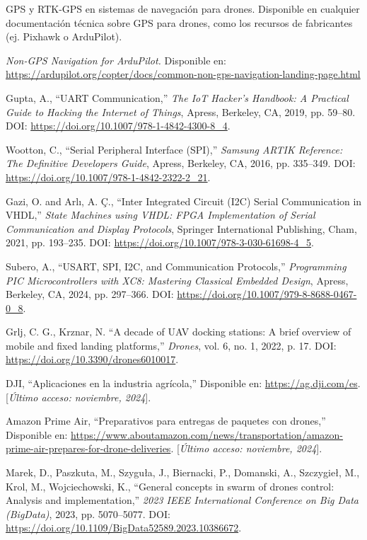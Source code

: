 \begin{thebibliography}{30}
        GPS y RTK-GPS en sistemas de navegación para drones. Disponible en cualquier documentación técnica sobre GPS para drones, como los recursos de fabricantes (ej. Pixhawk o ArduPilot).
    
        \textit{Non-GPS Navigation for ArduPilot.} Disponible en: \url{https://ardupilot.org/copter/docs/common-non-gps-navigation-landing-page.html}

    Gupta, A., ``UART Communication,'' \textit{The IoT Hacker's Handbook: A Practical Guide to Hacking the Internet of Things}, Apress, Berkeley, CA, 2019, pp. 59--80. DOI: \url{https://doi.org/10.1007/978-1-4842-4300-8_4}.

    Wootton, C., ``Serial Peripheral Interface (SPI),'' \textit{Samsung ARTIK Reference: The Definitive Developers Guide}, Apress, Berkeley, CA, 2016, pp. 335--349. DOI: \url{https://doi.org/10.1007/978-1-4842-2322-2_21}.

    Gazi, O. and Arlı, A. Ç., ``Inter Integrated Circuit (I2C) Serial Communication in VHDL,'' \textit{State Machines using VHDL: FPGA Implementation of Serial Communication and Display Protocols}, Springer International Publishing, Cham, 2021, pp. 193--235. DOI: \url{https://doi.org/10.1007/978-3-030-61698-4_5}.

    Subero, A., ``USART, SPI, I2C, and Communication Protocols,'' \textit{Programming PIC Microcontrollers with XC8: Mastering Classical Embedded Design}, Apress, Berkeley, CA, 2024, pp. 297--366. DOI: \url{https://doi.org/10.1007/979-8-8688-0467-0_8}.

    Grlj, C. G., Krznar, N. ``A decade of UAV docking stations: A brief overview of mobile and fixed landing platforms,'' \textit{Drones}, vol. 6, no. 1, 2022, p. 17. DOI: \url{https://doi.org/10.3390/drones6010017}.
    
    DJI, ``Aplicaciones en la industria agrícola,'' Disponible en: \url{https://ag.dji.com/es}. [\textit{Último acceso: noviembre, 2024}].

    Amazon Prime Air, ``Preparativos para entregas de paquetes con drones,'' Disponible en: \url{https://www.aboutamazon.com/news/transportation/amazon-prime-air-prepares-for-drone-deliveries}. [\textit{Último acceso: noviembre, 2024}].
    
    Marek, D., Paszkuta, M., Szyguła, J., Biernacki, P., Domanski, A., Szczygieł, M., Krol, M., Wojciechowski, K., ``General concepts in swarm of drones control: Analysis and implementation,'' \textit{2023 IEEE International Conference on Big Data (BigData)}, 2023, pp. 5070--5077. DOI: \url{https://doi.org/10.1109/BigData52589.2023.10386672}.


\end{thebibliography}
